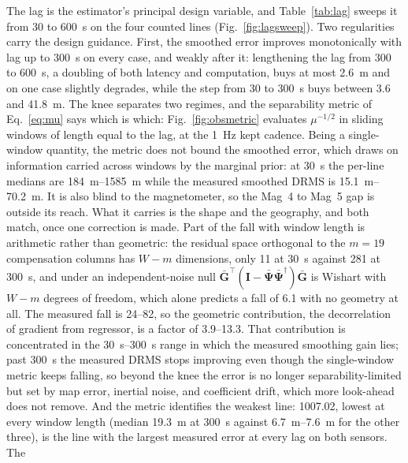 \documentclass{IEEEtaes}
\begin{document}
The lag is the estimator's principal design variable, and Table~\ref{tab:lag}
sweeps it from \SI{30}{} to \SI{600}{\second} on the four counted lines (Fig.~\ref{fig:lagsweep}). Two
regularities carry the design guidance. First, the smoothed error improves
monotonically with lag up to \SI{300}{\second} on every case, and weakly
after it: lengthening the lag from \SI{300}{} to \SI{600}{\second}, a
doubling of both latency and computation, buys at most \SI{2.6}{\meter} and on
one case slightly degrades, while the step from \SI{30}{} to \SI{300}{\second}
buys between \SI{3.6}{} and \SI{41.8}{\meter}. The knee separates two regimes,
and the separability metric of Eq.~\eqref{eq:mu} says which is which:
Fig.~\ref{fig:obsmetric} evaluates $\mu^{-1/2}$ in sliding windows of length
equal to the lag, at the \SI{1}{\hertz} kept cadence. Being a single-window quantity, the metric does
not bound the smoothed error, which draws on information carried across
windows by the marginal prior: at \SI{30}{\second} the per-line medians are
\SIrange{184}{1585}{\meter} while the measured smoothed DRMS is
\SIrange{15.1}{70.2}{\meter}. It is also blind to the magnetometer, so the
Mag~4 to Mag~5 gap is outside its reach. What it carries is the shape and
the geography, and both match, once one correction is made. Part of the fall
with window length is arithmetic rather than geometric: the residual space
orthogonal to the $m=19$ compensation columns has $W-m$ dimensions, only
\num{11} at \SI{30}{\second} against \num{281} at \SI{300}{\second}, and
under an independent-noise null $\bar{\mathbf{G}}^{\top}(\mathbf{I}-
\bar{\boldsymbol{\Psi}}\bar{\boldsymbol{\Psi}}^{\dagger})\bar{\mathbf{G}}$
is Wishart with $W-m$ degrees of freedom, which alone predicts a fall of
\num{6.1} with no geometry at all. The measured fall is \numrange{24}{82},
so the geometric contribution, the decorrelation of gradient from regressor,
is a factor of \numrange{3.9}{13.3}. That contribution is concentrated in
the \SIrange{30}{300}{\second} range in which the measured smoothing gain
lies; past \SI{300}{\second}
the measured DRMS stops improving even though the single-window metric keeps
falling, so beyond the knee the error is no longer separability-limited but
set by map error, inertial noise, and coefficient drift, which more
look-ahead does not remove. And the metric identifies the weakest line:
1007.02, lowest at every window length (median \SI{19.3}{\meter} at
\SI{300}{\second} against \SIrange{6.7}{7.6}{\meter} for the other three),
is the line with the largest measured error at every lag on both sensors. The
\end{document}
